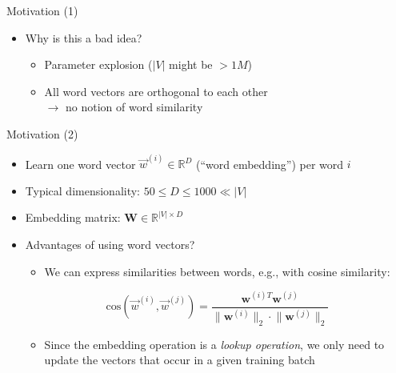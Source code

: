 \begin{vbframe}{Motivation (1)}
\begin{itemize}
	\item \ques Why is this a bad idea?
		\begin{itemize}
			\item Parameter explosion ($|V|$ might be $> 1M$)
			\item All word vectors are orthogonal to each other\\$\rightarrow$ no notion of word similarity
		\end{itemize}
\end{itemize}

\vfill

\end{vbframe}


\begin{vbframe}{Motivation (2)}

\vfill

\begin{itemize}
	\item Learn one word vector $\vec w^{(i)} \in \mathbb{R}^{D}$ (``word embedding'') per word $i$
	\item Typical dimensionality: $50 \leq D \leq 1000 \ll |V|$
	\item Embedding matrix: $\mathbf{W} \in \mathbb{R}^{|V|\times D}$
	\item \ques Advantages of using word vectors?
		\begin{itemize}
			\item We can express similarities between words, e.g., with cosine similarity:
		\end{itemize}
		 $$\mathrm{cos}(\vec w^{(i)}, \vec w^{(j)}) = \frac{\mathbf{w}^{(i)T}\mathbf{w}^{(j)}}{\lVert \mathbf{w}^{(i)} \rVert_2 \cdot \lVert \mathbf{w}^{(j)}\lVert_2}$$
		\begin{itemize}
			\item Since the embedding operation is a \emph{lookup operation}, we only need to update the vectors that occur in a given training batch
		\end{itemize}
\end{itemize}

\vfill

\end{vbframe}


